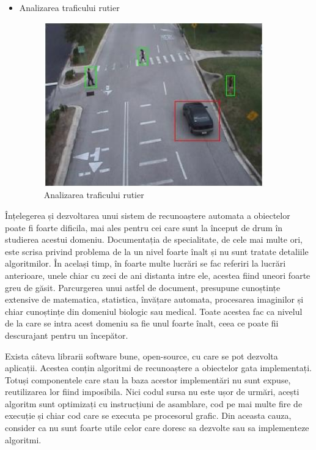\begin{itemize}
	
	\item Analizarea traficului rutier	
	\begin{figure}[H]
		\centering
			\includegraphics[width=0.9\textwidth]{imagini/traffic_analisys.jpg}
		\caption{Analizarea traficului rutier}
		\label{fig:traffic_analisys}
	\end{figure}
\end{itemize}


Înțelegerea și dezvoltarea unui sistem de recunoaștere automata a obiectelor poate fi foarte dificila, mai ales pentru cei care sunt la început de drum în studierea acestui domeniu. 
Documentația de specialitate, de cele mai multe ori, este scrisa privind problema de la un nivel foarte înalt și nu sunt tratate detaliile algoritmilor. 
În același timp, în foarte multe lucrări se fac referiri la lucrări anterioare, unele chiar cu zeci de ani distanta intre ele, acestea fiind uneori foarte greu de găsit.
Parcurgerea unui astfel de document, presupune cunoștințe extensive de matematica, statistica, învățare automata, procesarea imaginilor și chiar cunoștințe din domeniul biologic sau medical. 
Toate acestea fac ca nivelul de la care se intra acest domeniu sa fie unul foarte înalt, ceea ce poate fii descurajant pentru un începător.

Exista câteva librarii software bune, open-source, cu care se pot dezvolta aplicații. 
Acestea conțin algoritmi de recunoaștere a obiectelor gata implementați. 
Totuși componentele care stau la baza acestor implementări nu sunt expuse, reutilizarea lor fiind imposibila.
Nici codul sursa nu este ușor de urmări, acești algoritm sunt optimizați cu instrucțiuni de asamblare, cod pe mai multe fire de execuție și chiar cod care se executa pe procesorul grafic.
Din aceasta cauza, consider ca nu sunt foarte utile celor care doresc sa dezvolte sau sa implementeze algoritmi.

